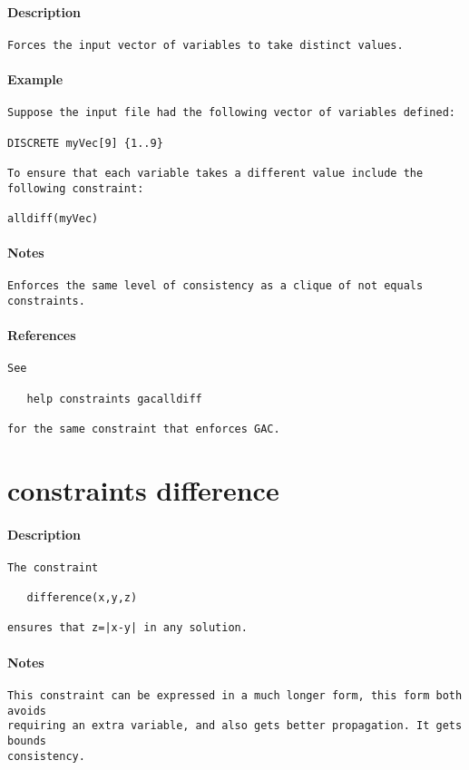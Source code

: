 \paragraph{Description}
{\footnotesize
\begin{verbatim}
Forces the input vector of variables to take distinct values.
\end{verbatim}
}
\paragraph{Example}
{\footnotesize
\begin{verbatim}
Suppose the input file had the following vector of variables defined:

DISCRETE myVec[9] {1..9}

To ensure that each variable takes a different value include the
following constraint:

alldiff(myVec)
\end{verbatim}
}
\paragraph{Notes}
{\footnotesize
\begin{verbatim}
Enforces the same level of consistency as a clique of not equals 
constraints.
\end{verbatim}
}
\paragraph{References}
{\footnotesize
\begin{verbatim}
See

   help constraints gacalldiff

for the same constraint that enforces GAC.
\end{verbatim}
}
\section{constraints difference}
\paragraph{Description}
{\footnotesize
\begin{verbatim}
The constraint

   difference(x,y,z)

ensures that z=|x-y| in any solution.
\end{verbatim}
}
\paragraph{Notes}
{\footnotesize
\begin{verbatim}
This constraint can be expressed in a much longer form, this form both avoids
requiring an extra variable, and also gets better propagation. It gets bounds
consistency.
\end{verbatim}
}
